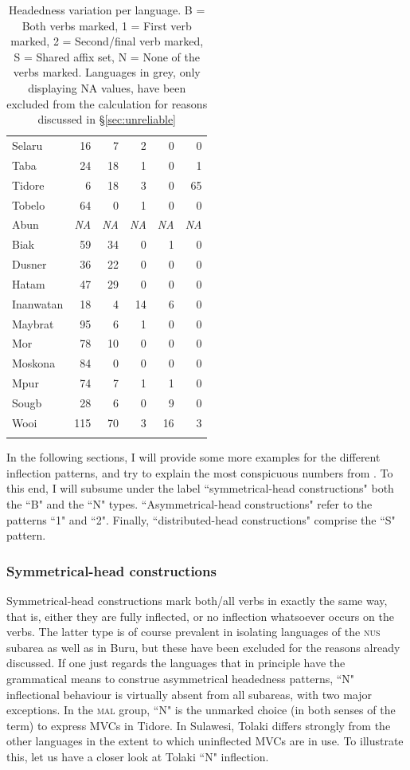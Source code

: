 \begin{table}
\begin{tabular}{lrrrrr}
  Selaru &  16 &   7 &   2 &   0 &   0 \tabularnewline 
  Taba &  24 &  18 &   1 &   0 &   1 \tabularnewline 
  Tidore & 6 & 18 & 3 & 0 & 65 \tabularnewline
  Tobelo &  64 &   0 &   1 &   0 &   0 \tabularnewline \midrule 
  {\color{gray}Abun} & {\color{gray}\textit{NA}} & {\color{gray}\textit{NA}} & {\color{gray}\textit{NA}} &   {\color{gray}\textit{NA}} & {\color{gray}\textit{NA}} \tabularnewline
  Biak &  59 &  34 &   0 &   1 &   0 \tabularnewline
  Dusner &  36 &  22 &   0 &   0 &   0 \tabularnewline
  Hatam &  47 &  29 &   0 &   0 &   0 \tabularnewline
  Inanwatan &  18 &   4 &  14 &   6 &   0 \tabularnewline
  Maybrat &  95 &   6 &   1 &   0 &   0 \tabularnewline 
  Mor &  78 &  10 &   0 &   0 &   0 \tabularnewline
  Moskona &  84 &   0 &   0 &   0 &   0 \tabularnewline
  Mpur &  74 &   7 &   1 &   1 &   0 \tabularnewline
  Sougb &  28 &   6 &   0 &   9 &   0 \tabularnewline 
  Wooi & 115 &  70 &   3 &  16 &   3 \tabularnewline
   \lspbottomrule
\end{tabular}
\caption[Headedness variation per language]{Headedness variation per language. B = Both verbs marked, 1 = First verb marked, 2 = Second/final verb marked, S = Shared affix set, N = None of the verbs marked. Languages in grey, only displaying \textsc{NA} values, have been excluded from the calculation for reasons discussed in §\ref{sec:unreliable}}
\label{table:Headedness_per_lang}
\end{table}

In the following sections, I will provide some more examples for the different inflection patterns, and try to explain the most conspicuous numbers from . To this end, I will subsume under the label ``symmetrical-head constructions" both the ``B" and the ``N" types. ``Asymmetrical-head constructions" refer to the patterns ``1" and ``2". Finally, ``distributed-head constructions" comprise the ``S" pattern.

\subsubsection{Symmetrical-head constructions}\label{sec:symmetrical-head}

Symmetrical-head constructions mark both/all verbs in exactly the same way, that is, either they are fully inflected, or no inflection whatsoever occurs on the verbs. The latter type is of course prevalent in isolating languages of the \textsc{nus} subarea as well as in Buru, but these have been excluded for the reasons already discussed. If one just regards the languages that in principle have the grammatical means to construe asymmetrical headedness patterns, ``N" inflectional behaviour is virtually absent from all subareas, with two major exceptions. In the \textsc{mal} group, ``N" is the unmarked choice (in both senses of the term) to express MVCs in Tidore. In Sulawesi, Tolaki differs strongly from the other languages in the extent to which uninflected MVCs are in use. To illustrate this, let us have a closer look at Tolaki ``N" inflection.

